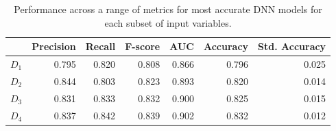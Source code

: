 \def\year{2017}\relax \documentclass[letterpaper]{article}
\begin{document}
\begin{table}
\begin{tabularx}{\linewidth}{l r r r r r r}
		\toprule[.2em]
		 &{\bf Precision}& {\bf Recall}&{\bf F-score}&{\bf AUC}&{\bf Accuracy}&{\bf Std. Accuracy}\\
		\midrule
		$D_1$&0.795& 0.820&0.808 &0.866&0.796&0.025\\
		$D_2$&0.844 &0.803&0.823 &0.893&0.820&0.014\\
		$D_3$&0.831& 0.833&0.832 &0.900&0.825&0.015\\
		$D_4$&0.837& 0.842&0.839 &0.902&0.832&0.012\\
		\bottomrule[.2em]
	\end{tabularx}
	\caption{Performance across a range of metrics for most accurate DNN models for each subset of input variables.} \label{tab:dnnperf}
\end{table}

\end{document}
